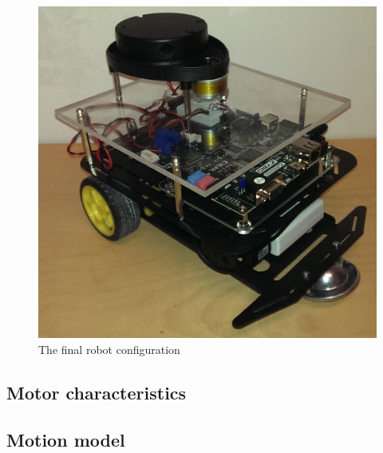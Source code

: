 \documentclass[Main]{subfiles}
\begin{document}
\begin{figure}[H]
	\centering
	\includegraphics[scale=0.3]{./Figures/final_robot.png}
	\caption{The final robot configuration}
	\label{fig:final_robot}
\end{figure}\noindent

	\subsection{Motor characteristics} %
		\label{sub:motor_characteristics}
		

	\subsection{Motion model} %
		\label{sub:motion_model}
		

\end{document}
